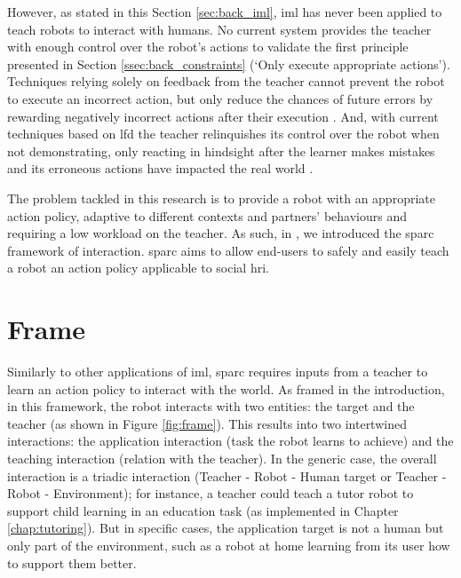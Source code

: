However, as stated in this Section \ref{sec:back_iml}, \gls{iml} has never been applied to teach robots to interact with humans. No current system provides the teacher with enough control over the robot's actions to validate the first principle presented in Section \ref{ssec:back_constraints} (`Only execute appropriate actions'). Techniques relying solely on feedback from the teacher cannot prevent the robot to execute an incorrect action, but only reduce the chances of future errors by rewarding negatively incorrect actions after their execution \citep{senft2017supervised}. And, with current techniques based on \gls{lfd} the teacher relinquishes its control over the robot when not demonstrating, only reacting in hindsight after the learner makes mistakes and its erroneous actions have impacted the real world \citep{chernova2009interactive}.

The problem tackled in this research is to provide a robot with an appropriate action policy, adaptive to different contexts and partners' behaviours and requiring a low workload on the teacher. As such, in \cite{senft2015sparc}, we introduced the \gls{sparc} framework of interaction. \gls{sparc} aims to allow end-users to safely and easily teach a robot an action policy applicable to social \gls{hri}.


\section{Frame}

Similarly to other applications of \gls{iml}, \gls{sparc} requires inputs from a teacher to learn an action policy to interact with the world. As framed in the introduction, in this framework, the robot interacts with two entities: the target and the teacher (as shown in Figure \ref{fig:frame}). This results into two intertwined interactions: the application interaction (task the robot learns to achieve) and the teaching interaction (relation with the teacher). In the generic case, the overall interaction is a triadic interaction (Teacher - Robot - Human target or Teacher - Robot - Environment); for instance, a teacher could teach a tutor robot to support child learning in an education task (as implemented in Chapter \ref{chap:tutoring}). But in specific cases, the application target is not a human but only part of the environment, such as a robot at home learning from its user how to support them better.

